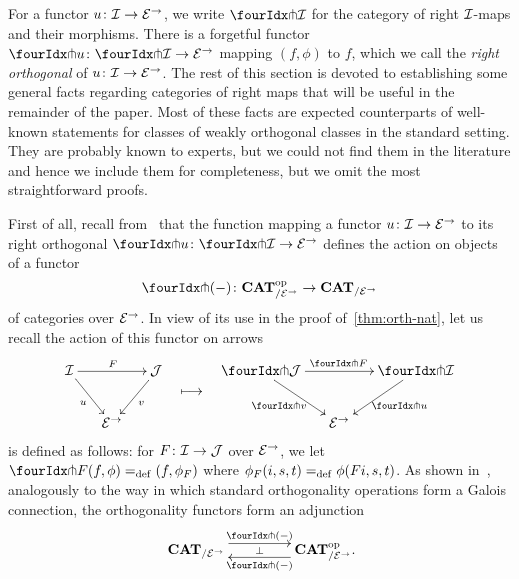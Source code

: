 \documentclass[reqno,10pt,a4paper,oneside,draft]{amsart}
\begin{document}
For a functor $u \co \cal{I} \to \catE^\to$, we write $\liftr{\cal{I}}$ for the category of right $\cal{I}$-maps and their morphisms.
There is a forgetful functor~$\liftr{u} \co \liftr{\cal{I}} \to \catE^\to$ mapping $(f, \phi)$ to $f$, which we 
call   the \emph{right orthogonal} of $u \co \cal{I} \to \catE^\to$. The rest of this section is devoted to establishing some general facts regarding categories of right maps that will be useful in the remainder of the paper.
Most of these facts are expected counterparts of well-known statements for classes of weakly orthogonal classes in the standard setting.
They are probably known to experts, but we could not find them in the literature and hence we include them for completeness, but we omit the most straightforward proofs.


First of all, recall from~\cite{garner:small-object-argument} that the function mapping a functor $u \co \cal{I} \to \catE^\to$ to its right orthogonal $\liftr{u} \co \liftr{\cal{I}} \to \catE^\to$ defines the action on objects of a functor
\[
  \liftr{\brarghole} \co \CAT_{/\catE^\to}^{\op} \to \CAT_{/\catE^\to}
\]
of categories over $\catE^\to$.
In view of its use in the proof of~\cref{thm:orth-nat}, let us recall the action of this functor on arrows
\[
\begin{aligned}
\xymatrix@C-1em{
  \cal{I}
  \ar[dr]_{u}
  \ar[rr]^{F}
&&
  \cal{J}
  \ar[dl]^{v}
\\&
  \catE^\to
}
&&
\xymatrix{
  \ar@{}[d]|{\textstyle\longmapsto} \\
  {}
}
&&
\xymatrix@C-1em{
  \liftr{\cal{J}}
  \ar[dr]_{\liftr{v}}
  \ar[rr]^{\liftr{F}}
&&
  \liftr{\cal{I}}
  \ar[dl]^{\liftr{u}}
\\&
  \catE^\to
}
\end{aligned}
\]
is defined as follows: for $F \co \cal{I} \to \cal{J}$ over $\catE^\to$, we let $\liftr{F}(f,\phi) \defeq (f, \phi_F)$ where $\phi_F(i, s, t) \defeq \phi(Fi, s, t)$.
As shown in~\cite[Proposition~3.8]{garner:small-object-argument}, analogously to the way in which standard orthogonality operations form a Galois connection, the orthogonality functors form an adjunction
\begin{equation} \label{garner-adjunction}
\begin{gathered}
\xymatrix@C+2em{
  \CAT_{/\catE^\to}
  \ar@<5pt>[r]^-{\liftl{\brarghole}}
  \ar@{}[r]|-{\bot}
&
  \CAT_{/\catE^\to}^{\op} \rlap{.}
  \ar@<5pt>[l]^-{\liftr{\brarghole}}
}
\end{gathered}
\end{equation}
\end{document}
